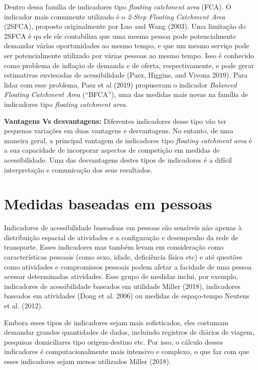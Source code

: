 \documentclass[
  letterpaper,
  DIV=11,
  numbers=noendperiod]{scrreprt}
\begin{document}
Dentro dessa família de indicadores tipo \emph{floating catchment area}
(FCA). O indicador mais comumente utilizado é o \emph{2-Step Floating
Catchment Area} (2SFCA), proposto originalmente por Luo and Wang (2003).
Uma limitação do 2SFCA é qu ele ele contabiliza que uma mesma pessoa
pode potencialmente demandar várias oportunidades ao mesmo tempo, e que
um mesmo serviço pode ser potencialmente utilizado por várias pessoas ao
mesmo tempo. Isso é conhecido como problema de inflação de demanda e de
oferta, respectivamente, e pode gerar estimativas enviesadas de
acessibilidade (Paez, Higgins, and Vivona 2019). Para lidar com esse
problema, Paez et al (2019) propuseram o indicador \emph{Balanced
Floating Catchment Area} (``BFCA''), uma das medidas mais novas na
família de indicadores tipo \emph{floating catchment area}.

\textbf{Vantagens Vs desvantagens:} Diferentes indicadores desse tipo
vão ter pequenas variações em duas vantagens e desvantagens. No entanto,
de uma maneira geral, a principal vantagem de indicadores tipo
\emph{floating catchment area} é a sua capacidade de incorporar aspectos
de competição em medidas de acessibilidade. Uma das desvantagens destes
tipos de indicadores é a difícil interpretação e comunicação dos seus
resultados.

\hypertarget{medidas-baseadas-em-pessoas}{%
\section{Medidas baseadas em
pessoas}\label{medidas-baseadas-em-pessoas}}

Indicadores de acessibilidade baseadoas em pessoas são sensíveis não
apenas à distribuição espacial de atividades e a configuração e
desempenho da rede de transporte. Esses indicadores mas também levam em
consideração como características pessoais (como sexo, idade,
deficiência física etc) e até questões como atividades e compromissos
pessoais podem afetar a facidade de uma pessoa acessar determinadas
atividades. Esse grupo de medidas inclui, por exemplo, indicadores de
acessibilidade baseados em utilidade Miller (2018), indicadores baseados
em atividades (Dong et al. 2006) ou medidas de espaço-tempo Neutens et
al. (2012).

Embora esses tipos de indicadores sejam mais sofisticados, eles costumam
demandar grandes quantidades de dados, incluindo registros de diários de
viagem, pesquisas domiciliares tipo origem-destino etc. Por isso, o
cálculo desses indicadores é computacionalmente mais intensivo e
complexo, o que faz com que esses indicadores sejam menos utilizados
Miller (2018).
\end{document}
